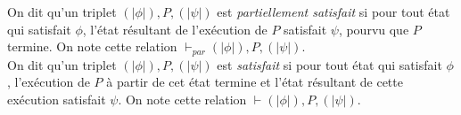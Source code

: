 \documentclass[a4paper]{article}
\begin{document}
  On dit qu'un triplet $(|\phi|), P, (|\psi|)$ est \textit{partiellement satisfait} si
  pour tout état qui satisfait $\phi$, l'état résultant de l'exécution de $P$
  satisfait $\psi$, pourvu que $P$ termine. On note cette relation $\vdash_{par} (|\phi|), P, (|\psi|)$.\\

  On dit qu'un triplet $(|\phi|), P, (|\psi|)$ est \textit{satisfait} si
  pour tout état qui satisfait $\phi$, l'exécution de $P$ à partir de cet état termine
  et l'état résultant de cette exécution satisfait $\psi$. On note cette relation $\vdash (|\phi|), P, (|\psi|)$.
\end{document}
